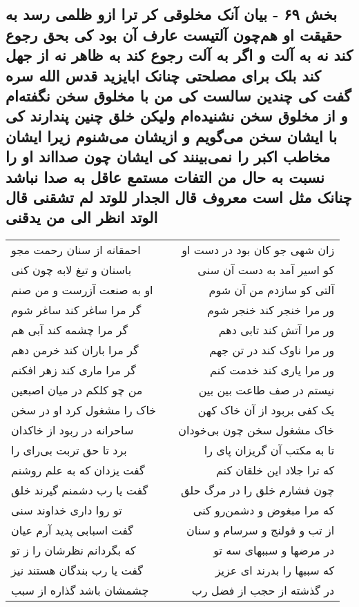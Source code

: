 \begin{center}
\section*{بخش ۶۹ - بیان آنک مخلوقی کر ترا ازو ظلمی رسد به حقیقت او هم‌چون  آلتیست عارف آن بود کی بحق رجوع کند نه به آلت و اگر به آلت رجوع  کند به ظاهر نه از جهل کند بلک برای مصلحتی چنانک ابایزید قدس  الله سره گفت کی چندین سالست کی من با مخلوق سخن نگفته‌ام و از مخلوق  سخن نشنیده‌ام ولیکن خلق چنین پندارند کی با ایشان سخن می‌گویم و ازیشان می‌شنوم زیرا ایشان مخاطب اکبر را نمی‌بینند کی ایشان چون صدااند او را نسبت به حال من التفات مستمع عاقل به صدا نباشد چنانک مثل است معروف قال الجدار للوتد لم تشقنی قال الوتد انظر الی من یدقنی}
\label{sec:sh069}
\begin{longtable}{l p{0.5cm} r}
احمقانه از سنان رحمت مجو
&&
زان شهی جو کان بود در دست او
\\
باسنان و تیغ لابه چون کنی
&&
کو اسیر آمد به دست آن سنی
\\
او به صنعت آزرست و من صنم
&&
آلتی کو سازدم من آن شوم
\\
گر مرا ساغر کند ساغر شوم
&&
ور مرا خنجر کند خنجر شوم
\\
گر مرا چشمه کند آبی هم
&&
ور مرا آتش کند تابی دهم
\\
گر مرا باران کند خرمن دهم
&&
ور مرا ناوک کند در تن جهم
\\
گر مرا ماری کند زهر افکنم
&&
ور مرا یاری کند خدمت کنم
\\
من چو کلکم در میان اصبعین
&&
نیستم در صف طاعت بین بین
\\
خاک را مشغول کرد او در سخن
&&
یک کفی بربود از آن خاک کهن
\\
ساحرانه در ربود از خاکدان
&&
خاک مشغول سخن چون بی‌خودان
\\
برد تا حق تربت بی‌رای را
&&
تا به مکتب آن گریزان پای را
\\
گفت یزدان که به علم روشنم
&&
که ترا جلاد این خلقان کنم
\\
گفت یا رب دشمنم گیرند خلق
&&
چون فشارم خلق را در مرگ حلق
\\
تو روا داری خداوند سنی
&&
که مرا مبغوض و دشمن‌رو کنی
\\
گفت اسبابی پدید آرم عیان
&&
از تب و قولنج و سرسام و سنان
\\
که بگردانم نظرشان را ز تو
&&
در مرضها و سببهای سه تو
\\
گفت یا رب بندگان هستند نیز
&&
که سببها را بدرند ای عزیز
\\
چشمشان باشد گذاره از سبب
&&
در گذشته از حجب از فضل رب

\end{longtable}
\end{center}

